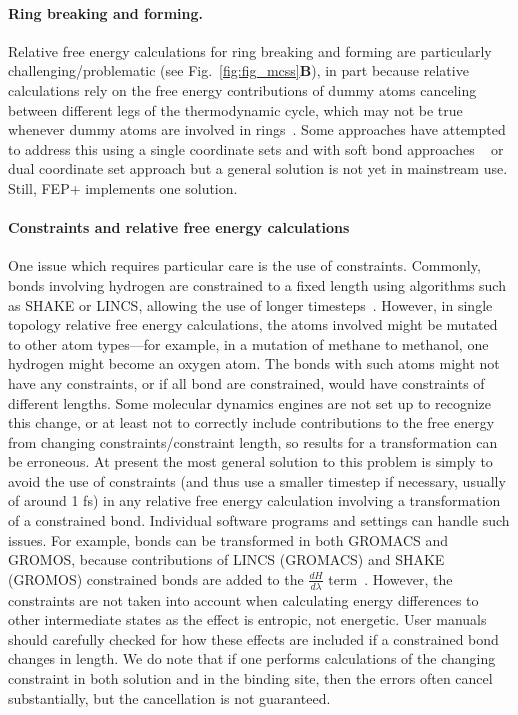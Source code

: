 \documentclass[9pt,bestpractices]{livecoms}
\begin{document}
\paragraph{Ring breaking and forming.} Relative free energy calculations for ring breaking and forming are particularly challenging/problematic (see Fig.~\ref{fig:fig_mcss}\textbf{B}), in part because relative calculations rely on the free energy contributions of dummy atoms canceling between different legs of the thermodynamic cycle, which may not be true whenever dummy atoms are involved in rings~\cite{liu2015ring}.
Some approaches have attempted to address this using a single coordinate sets and with soft bond approaches ~\cite{clark2019relative,wang2017accurate} or dual coordinate set approach \cite{jespers2019qligfep, ries2022relative} but a general solution is not yet in mainstream use. Still, FEP+ implements one solution\cite{wang2017accurate}.

\paragraph{Constraints and relative free energy calculations}
One issue which requires particular care is the use of constraints.
Commonly, bonds involving hydrogen are constrained to a fixed length using algorithms such as SHAKE or LINCS, allowing the use of longer timesteps~\cite{krautler2001fast}.
However, in single topology relative free energy calculations, the atoms involved might be mutated to other atom types---for example, in a mutation of methane to methanol, one hydrogen might become an oxygen atom. The bonds with such atoms might not have any constraints, or if all bond are constrained, would have constraints of different lengths. 
Some molecular dynamics engines are not set up to recognize this change, or at least not to correctly include contributions to the free energy from changing constraints/constraint length, so results for a transformation can be erroneous.
At present the most general solution to this problem is simply to avoid the use of constraints (and thus use a smaller timestep if necessary, usually of around 1 fs) in any relative free energy calculation involving a transformation of a constrained bond. Individual software programs and settings can handle such issues. For example, bonds can be transformed in both GROMACS and GROMOS, because contributions of LINCS (GROMACS) and SHAKE (GROMOS) constrained bonds are added to the $\frac{dH}{d\lambda}$ term~\cite{pearlman1993determining, straatsma1992holonomic, pearlman1991overlooked, gunsteren1989computer}. However, the constraints are not taken into account when calculating energy differences to other intermediate states as the effect is entropic, not energetic. User manuals should carefully checked for how these effects are included if a constrained bond changes in length. We do note that if one performs calculations of the changing constraint in both solution and in the binding site, then the errors often cancel substantially, but the cancellation is not guaranteed.
\end{document}
